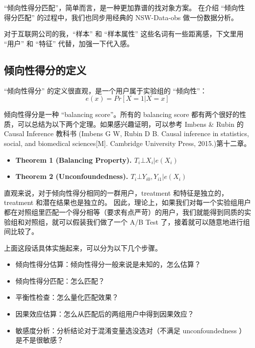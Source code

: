 \documentclass[12pt]{article}
\begin{document}
“倾向性得分匹配”，简单而言，是一种更加靠谱的找对象方案。
在介绍 “倾向性得分匹配” 的过程中，我们也同步用经典的 NSW-Data-obs 做一份数据分析。

对于互联网公司的我，“样本” 和 “样本属性” 这些名词有一些距离感，下文里用 “用户” 和 “特征” 代替，加强一下代入感。

\subsection{倾向性得分的定义}
“倾向性得分” 的定义很直观，是一个用户属于实验组的 “倾向性”： 
$$
e(x) = Pr[X=1|X=x]
$$

倾向性得分是一种 “balancing score”。所有的 balancing score 都有两个很好的性质，可以总结为以下两个定理。如果感兴趣证明，可以参考 Imbens \& Rubin 的 Causal Inference 教科书 (Imbens G W, Rubin D B. Causal inference in statistics, social, and biomedical sciences[M]. Cambridge University Press, 2015.)第十二章。

\begin{mdframed}[
linecolor=black!40,outerlinewidth=1pt,roundcorner=.5em,innertopmargin=1ex,innerbottommargin=.5\baselineskip,innerrightmargin=1em,innerleftmargin=1em,backgroundcolor=gray!5,
]
\begin{itemize}
\setlength{\itemsep}{0pt}
\setlength{\parsep}{0pt}
\setlength{\parskip}{0pt}
    \item \textbf{Theorem 1 (Balancing Property). $T_i \bot X_i|e(X_i)$}
    \item \textbf{Theorem 2 (Unconfoundedness). $T_i \bot Y_{i0},Y_{i1}|e(X_i)$}
\end{itemize}
\end{mdframed}

直观来说，对于倾向性得分相同的一群用户，treatment 和特征是独立的，treatment 和潜在结果也是独立的。
因此，理论上，如果我们对每一个实验组用户都在对照组里匹配一个得分相等（要求有点严苛）的用户，我们就能得到同质的实验组和对照组，就可以假装我们做了一个 A/B Test 了，接着就可以随意地进行组间比较了。

上面这段话具体实施起来，可以分为以下几个步骤。

\begin{itemize}
\setlength{\itemsep}{0pt}
\setlength{\parsep}{0pt}
\setlength{\parskip}{0pt}
    \item 倾向性得分估算：倾向性得分一般来说是未知的，怎么估算？         
    \item 倾向性得分匹配：怎么匹配？
    \item 平衡性检查：怎么量化匹配效果？
    \item 因果效应估算：怎么从匹配后的两组用户中得到因果效应？
    \item 敏感度分析：分析结论对于混淆变量选没选对（不满足 unconfoundedness ）是不是很敏感？
\end{itemize}
\end{document}
